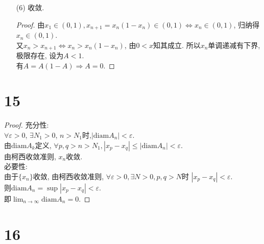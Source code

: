 \documentclass{article}
\begin{document}
\begin{itemize}
\begin{proof}
        所以$x_n$单调递减有下界, 极限存在, 设为$A < 1$. \\
        有$A = 1 - \sqrt{1 - A} \Rightarrow A = 0$.
    \end{proof}
    \item[(6)]
    收敛.
    \begin{proof}
        由$x_1 \in (0, 1), x_{n + 1} = x_n(1 - x_n) \in (0, 1) \Leftrightarrow x_n \in (0, 1) $, 归纳得$x_n \in (0, 1)$. \\
        又$x_n > x_{n + 1} \Leftrightarrow x_n > x_n(1 - x_n) $, 由$0 < x$知其成立.
        所以$x_n$单调递减有下界, 极限存在, 设为$A < 1$. \\
        有$A = A(1 - A) \Rightarrow A = 0$.
    \end{proof}
\end{itemize}

\section*{15}

\begin{proof}
    充分性: \\
    $\forall \varepsilon > 0$, $\exists N_1 > 0$, $n > N_1 \text{时,} \left\lvert \text{diam}A_n\right\rvert < \varepsilon $. \\
    由$\text{diam}A_k$定义, $\forall p, q > n > N_1, \left\lvert x_p - x_q\right\rvert \leqslant \left\lvert \text{diam}A_n\right\rvert < \varepsilon$. \\
    由柯西收敛准则, ${x_n}$收敛. \\
    必要性: \\
    由于$\{x_n\}$收敛, 由柯西收敛准则, $\forall \varepsilon > 0, \exists N > 0, p, q > N$时 $\left\lvert x_p - x_q\right\rvert < \varepsilon$. \\
    则$\text{diam}A_n = \sup {\left\lvert x_p - x_q\right\rvert } < \varepsilon$. \\
    即$\lim_{n \to \infty}\text{diam}A_n = 0$.
\end{proof}

\section*{16}
\end{document}
